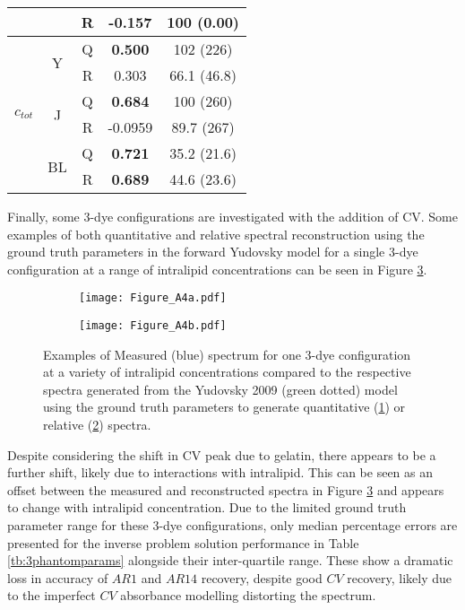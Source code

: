\begin{table}[htbp]
\begin{tabular}{|ccc|cc|}
        & & R & -0.157 & 100 (0.00) \\
        \hline
        \multirow{6}{*}{$c_{tot}$} & \multirow{2}{*}{Y} & Q &  \textbf{0.500} & 102 (226) \\
        & & R & 0.303 & 66.1 (46.8) \\
        \cline{2-5}
        & \multirow{2}{*}{J} & Q & \textbf{0.684} & 100 (260) \\
        & & R & -0.0959 & 89.7 (267)\\
        \cline{2-5}
        & \multirow{2}{*}{BL} & Q & \textbf{0.721} & 35.2 (21.6) \\
        & & R & \textbf{0.689} & 44.6 (23.6)\\
        \hline
    \end{tabular}
    \label{tb:phantomparams}
\end{table}

Finally, some 3-dye configurations are investigated with the addition of CV. Some examples of both quantitative and relative spectral reconstruction using the ground truth parameters in the forward Yudovsky model for a single 3-dye configuration at a range of intralipid concentrations can be seen in Figure \ref{fig:3phantomforwards}. 

\begin{figure}[htb!]
    \centering
    \begin{subfigure}{0.8\textwidth}
        \texttt{[image: Figure\_A4a.pdf]}
        \caption{}
        \label{fig:3phantomforwardsquant}
    \end{subfigure}
    \begin{subfigure}{0.8\textwidth}
        \texttt{[image: Figure\_A4b.pdf]}
        \caption{}
        \label{fig:3phantomforwardsnorm}
    \end{subfigure}
    \caption{Examples of Measured (blue) spectrum for one 3-dye configuration at a variety of intralipid concentrations compared to the respective spectra generated from the Yudovsky 2009 (green dotted) model using the ground truth parameters to generate quantitative (\ref{fig:3phantomforwardsquant}) or relative (\ref{fig:3phantomforwardsnorm}) spectra.}
 \label{fig:3phantomforwards}
\end{figure}

Despite considering the shift in CV peak due to gelatin, there appears to be a further shift, likely due to interactions with intralipid. This can be seen as an offset between the measured and reconstructed spectra in Figure \ref{fig:3phantomforwards} and appears to change with intralipid concentration. Due to the limited ground truth parameter range for these 3-dye configurations, only median percentage errors are presented for the inverse problem solution performance in Table \ref{tb:3phantomparams} alongside their inter-quartile range. These show a dramatic loss in accuracy of $AR1$ and $AR14$ recovery, despite good $CV$ recovery, likely due to the imperfect $CV$ absorbance modelling distorting the spectrum. 

